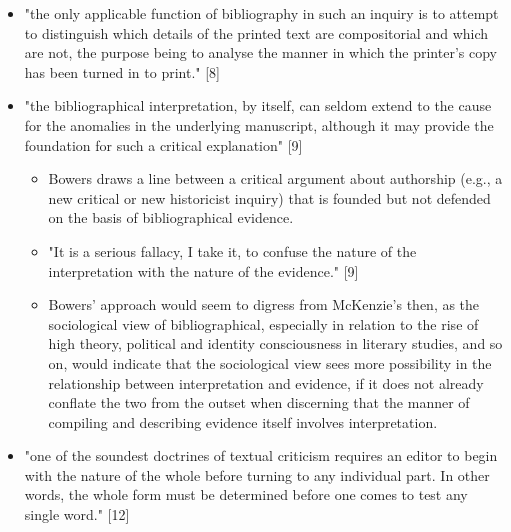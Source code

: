 \documentclass[course, english]{Notes}
\newcommand{\n}{\scalebox{2}{\textbf{\framebox{$\aleph$} } } }
\begin{document}
\begin{itemize}
\item {"the only applicable function of bibliography in such an inquiry is to attempt to distinguish which details of the printed text are compositorial and which are not, the purpose being to analyse the manner in which the printer's copy has been turned in to print." [8]}
\item {"the bibliographical interpretation, by itself, can seldom extend to the cause for the anomalies in the underlying manuscript, although it may provide the foundation for such a critical explanation" [9]}
\begin{itemize}
\item{\n Bowers draws a line between a critical argument about authorship (e.g., a new critical or new historicist inquiry) that is founded but not defended on the basis of bibliographical evidence.}
\item {"It is a serious fallacy, I take it, to confuse the nature of the interpretation with the nature of the evidence." [9]}
\item {\n Bowers' approach would seem to digress from McKenzie's then, as the sociological view of bibliographical, especially in relation to the rise of high theory, political and identity consciousness in literary studies, and so on, would indicate that the sociological view sees more possibility in the relationship between interpretation and evidence, if it does not already conflate the two from the outset when discerning that the manner of compiling and describing evidence itself involves interpretation.}
\end{itemize}
\item{"one of the soundest doctrines of textual criticism requires an editor to begin with the nature of the whole before turning to any individual part. In other words, the whole form must be determined before one comes to test any single word." [12]}

\end{itemize}
\end{document}
